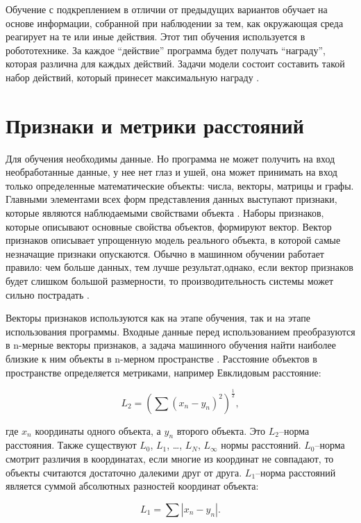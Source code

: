 Обучение с подкреплением в отличии от предыдущих вариантов обучает на основе информации, собранной при наблюдении за тем, как окружающая среда реагирует на те или иные действия. Этот тип обучения используется в робототехнике. За каждое “действие” программа будет получать “награду”, которая различна для каждых действий. Задачи модели состоит составить такой набор действий, который принесет максимальную награду \cite{8,10}.


\section{Признаки и метрики расстояний}

Для обучения необходимы данные. Но программа не может получить на вход необработанные данные, у нее нет глаз и ушей, она может принимать на вход только определенные математические объекты: числа, векторы, матрицы и графы. 
Главными элементами всех форм представления данных выступают признаки, которые являются наблюдаемыми свойствами объекта \cite{14}. Наборы признаков, которые описывают основные свойства объектов, формируют вектор. 
Вектор признаков описывает упрощенную модель реального объекта, в которой самые незначащие признаки опускаются. Обычно в машинном обучении работает правило: чем больше данных, тем лучше результат,однако, если вектор признаков будет слишком большой размерности, то производительность системы может сильно пострадать \cite{6,24}.

Векторы признаков используются как на этапе обучения, так и на этапе использования программы. Входные данные перед использованием преобразуются в n-мерные векторы признаков, а задача машинного обучения найти наиболее близкие к ним объекты в n-мерном пространстве \cite{11}. Расстояние объектов в пространстве определяется метриками, например Евклидовым расстояние:


\begin{equation}
L_{2} = (\sum (x_{n}-y_{n})^2)^\frac{1}{2},
\end{equation}

где $x_{n}$ координаты одного объекта, а $y_{n}$ второго объекта.
Это $L_{2}$--норма расстояния. Также существуют $L_{0}$,  $L_{1}$, …, $L_{N}$, $L_{\infty}$ нормы расстояний. $L_{0}$--норма смотрит различия в координатах, если многие из координат не совпадают, то объекты считаются достаточно далекими друг от друга. $L_{1}$--норма расстояний является суммой абсолютных разностей координат объекта:

\begin{equation}
L_{1} = \sum |x_{n}-y_{n}|.
\end{equation}

